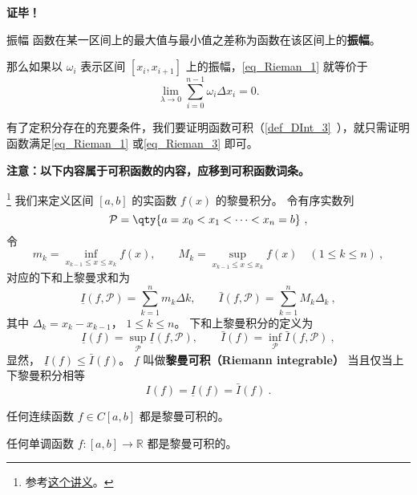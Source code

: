 \textbf{证毕！}

\begin{definition}{振幅}
函数在某一区间上的最大值与最小值之差称为函数在该区间上的\textbf{振幅}。
\end{definition}
那么如果以 $\omega_i$ 表示区间 $[x_i,x_{i+1}]$ 上的振幅，\autoref{eq_Rieman_1} 就等价于
\begin{equation}\label{eq_Rieman_3}
\lim_{\lambda\rightarrow0}\sum_{i=0}^{n-1}\omega_i\Delta x_i=0.
\end{equation}

有了定积分存在的充要条件，我们要证明函数可积（\autoref{def_DInt_3}~），就只需证明函数满足\autoref{eq_Rieman_1} 或\autoref{eq_Rieman_3} 即可。

\textbf{注意：以下内容属于可积函数的内容，应移到可积函数词条。}

\footnote{参考\href{https://math.berkeley.edu/~arveson/Dvi/105/note1.pdf}{这个讲义}。}
我们来定义区间 $[a, b]$ 的实函数 $f(x)$ 的黎曼积分。 令有序实数列
\begin{equation}
\mathcal P = \qty{a = x_0 < x_1 < \dots < x_n = b}~,
\end{equation}
令
\begin{equation}
m_k = \inf_{x_{k-1} \le x \le x_k} f(x), \qquad M_k = \sup_{x_{k-1} \le x \le x_k} f(x) \quad (1 \le k \le n)~,
\end{equation}
对应的下和上黎曼求和为
\begin{equation}
\underline I(f, \mathcal P) = \sum_{k = 1}^n m_k\Delta k, \qquad \bar I(f, \mathcal P) = \sum_{k = 1}^n M_k \Delta_k~,
\end{equation}
其中 $\Delta_k = x_k - x_{k-1}$， $1\le k\le n$。 下和上黎曼积分的定义为
\begin{equation}
\underline I(f) = \sup_{\mathcal P} \underline I(f, \mathcal P), \qquad \bar I(f) = \inf_{\mathcal P} \bar I(f, \mathcal P)~,
\end{equation}
显然， $\underline I(f) \le \bar I(f)$。 $f$ 叫做\textbf{黎曼可积（Riemann integrable）} 当且仅当上下黎曼积分相等
\begin{equation}
I(f) = \underline I(f) = \bar I(f)~.
\end{equation}

\begin{theorem}{}
任何连续函数 $f \in C[a, b]$ 都是黎曼可积的。
\end{theorem}

\begin{theorem}{}
任何单调函数 $f: [a, b] \to \mathbb{R}$ 都是黎曼可积的。
\end{theorem}

